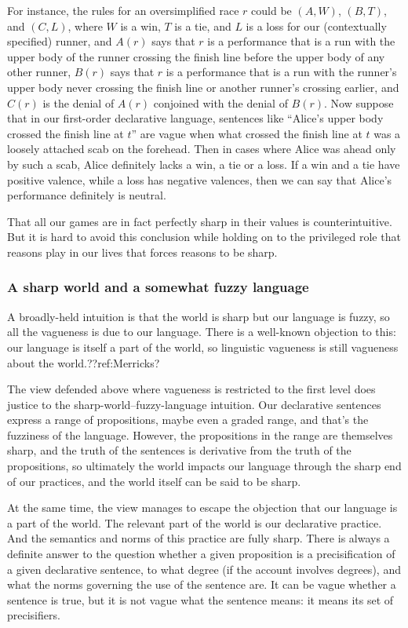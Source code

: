 For instance, the rules for an oversimplified race $r$ could be $(A,W)$, $(B,T)$, and $(C,L)$, where $W$ is a win, $T$ is a tie, 
and $L$ is a loss for our (contextually specified) runner, and $A(r)$ says that $r$ is a performance that is a run with the upper body of the runner crossing the finish
line before the upper body of any other runner, $B(r)$ says that $r$ is a performance that is a run with the runner's upper body never
crossing the finish line or another runner's crossing earlier, and $C(r)$ is the denial of $A(r)$ conjoined with the denial of $B(r)$.
Now suppose that in our first-order declarative language, sentences like ``Alice's upper body crossed the finish line at $t$'' are vague
when what crossed the finish line at $t$ was a loosely attached scab on the forehead. Then in cases where Alice was ahead only by such
a scab, Alice definitely lacks a win, a tie or a loss. If a win and a tie have positive valence, while a loss has negative valences, then
we can say that Alice's performance definitely is neutral.

That all our games are in fact perfectly sharp in their values is counterintuitive. But it is hard to avoid this conclusion while holding 
on to the privileged role that reasons play in our lives that forces reasons to be sharp.

\subsubsection{A sharp world and a somewhat fuzzy language}
A broadly-held intuition is that the world is sharp but our language is fuzzy, so all the vagueness is due to our language.
There is a well-known objection to this: our language is itself a part of the world, so linguistic vagueness is still vagueness
about the world.??ref:Merricks?

The view defended above where vagueness is restricted to the first level does justice to the sharp-world--fuzzy-language intuition. 
Our declarative sentences express a range of propositions, maybe even a graded range, and that's the 
fuzziness of the language. However, the propositions in the range are themselves sharp, and the truth of the sentences is
derivative from the truth of the propositions, so ultimately the world impacts our language through the sharp end of our
practices, and the world itself can be said to be sharp. 

At the same time, the view manages to escape the objection that our language is a part of the world. The relevant part of the world
is our declarative practice. And the semantics and norms of this practice are fully sharp. There is always a definite answer to 
the question whether a given proposition is a precisification of a given declarative sentence, to what degree (if the account 
involves degrees), and what the norms governing the use of the sentence are. It can be vague whether a sentence is true, but it 
is not vague what the sentence means: it means its set of precisifiers. 

